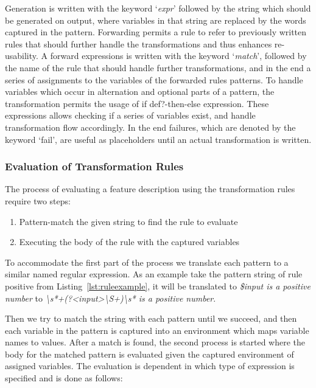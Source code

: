 Generation is written with the keyword `\emph{expr}'
followed by the string which should be generated on output, where variables
in that string are replaced by the words captured in the pattern.
Forwarding permits a rule to refer to previously written rules that should further handle the
transformations and thus enhances re-usability.
A forward expressions is written with the keyword `\emph{match}',
followed by the name of the rule that should handle further transformations,
and in the end a series of assignments to the variables of the forwarded
rules patterns.
To handle variables which occur in alternation and optional parts of a
pattern, the transformation permits the usage of if def?-then-else expression.
These expressions allows checking if a series of variables exist,
and handle transformation flow accordingly.
In the end failures, which are denoted by the keyword `fail',
are useful as placeholders until an actual transformation is written.

\subsubsection{Evaluation of Transformation Rules}
\label{sub:Evaluation of Transformation Rules}

The process of evaluating a feature description using the transformation rules require two steps:
\begin{enumerate}
  \item Pattern-match the given string to find the rule to evaluate
  \item Executing the body of the rule with the captured variables
\end{enumerate}
To accommodate the first part of the process we translate each pattern to a
similar named regular expression. As an example take the pattern string of rule positive from Listing~\ref{lst:ruleexample}, it will be translated 
to \textit{\$input is a positive number} to \textit{\textbackslash s*+(?\textless input\textgreater\textbackslash S+)\textbackslash s* is a positive number}.

Then we try to match the string with each pattern until we succeed,
and then each variable in the pattern is captured into an environment
which maps variable names to values.
After a match is found, the second process is started where the body
for the matched pattern is evaluated given the captured environment of assigned variables.
The evaluation is dependent in which type of expression is specified
and is done as follows:


